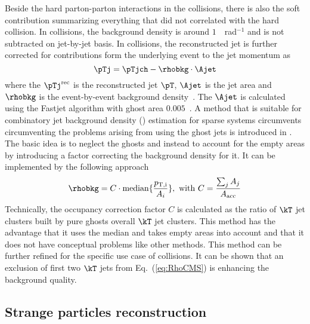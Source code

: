 Beside the hard parton-parton interactions in the collisions, there is also the soft contribution summarizing everything that did not correlated with the hard collision.
In \pp collisions, the background density is around $1$~\GeVc~rad$^{-1}$ and is not subtracted on jet-by-jet basis.
In \pPb collisions, the reconstructed jet is further corrected for contributions form the underlying event to the jet momentum as
\begin{equation}
\pTj = \pTjch - \rhobkg\cdot\Ajet
\label{eq:DeltaPt}
\end{equation}
where the $\pTj^{\rm rec}$ is the reconstructed jet $\pT$, $\Ajet$ is the jet area and $\rhobkg$ is the event-by-event background density~\cite{Cacciari:2007fd}.
The $\Ajet$ is calculated using the Fastjet algorithm with ghost area $0.005$~\cite{Cacciari:2008gn}.
A method that is suitable for combinatory jet background density (\rhobkg) estimation for sparse systems circumvents circumventing the problems arising from using the ghost jets is introduced in \cite{Chatrchyan:2012tt}.
The basic idea is to neglect the ghosts and instead to account for the empty areas by introducing a factor correcting the background density for it.
It can be implemented by the following approach
\begin{equation}
\rhobkg = C\cdot{\rm median}\{\frac{p_{\rm T,i}}{A_{i}}\},~{\rm with}~C = \frac{\sum_{j} A_{j}}{A_\mathrm{acc}}
\label{eq:RhoCMS}
\end{equation}
Technically, the occupancy correction factor $C$ is calculated as the ratio of $\kT$ jet clusters built by pure ghosts overall $\kT$ jet clusters.
This method has the advantage that it uses the median and takes empty areas into account and that it does not have conceptual problems like other methods.
This method can be further refined for the specific use case of \pPb collisions.
It can be shown that an exclusion of first two $\kT$ jets from Eq.~(\ref{eq:RhoCMS}) is enhancing the background quality.

\subsection{Strange particles reconstruction}%
\label{sec:ParRec}

